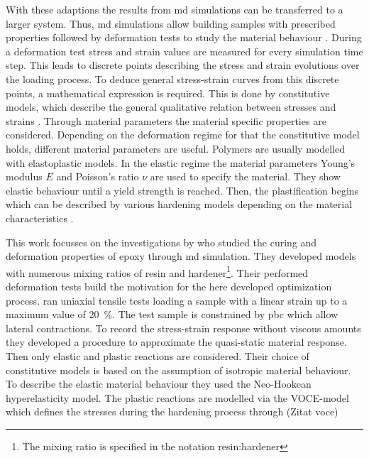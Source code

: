 With these adaptions the results from \acrshort{md} simulations can be transferred to a larger system. 
Thus, \acrshort{md} simulations allow building samples with prescribed properties followed by deformation tests to study the material behaviour \cite{buyukozturk_structural_2011}. During a deformation test stress and strain values are measured for every simulation time step. This leads to discrete points describing the stress and strain evolutions over the loading process. To deduce general stress-strain curves from this discrete points, a mathematical expression is required. This is done by constitutive models, which describe the general qualitative relation between stresses and strains \cite{mergheim_lecture_nodate}. Through material parameters the material specific properties are considered.
Depending on the deformation regime for that the constitutive model holds, different material parameters are useful. Polymers are usually modelled with elastoplastic models. In the elastic regime the material  parameters  Young's modulus $E$ and Poisson's ratio $\nu$ are used to specify the material. They show elastic behaviour until a yield strength is reached. 
Then, the plastification begins which can be described by various hardening models depending on the material characteristics \cite{mergheim_lecture_nodate}. 


This work focusses on the investigations by \citet{ries_deciphering_nodate} who studied the curing and deformation properties of epoxy through \acrshort{md} simulation. They developed models with numerous mixing ratios of resin and hardener\footnote{The mixing ratio is specified in the notation resin:hardener}. Their performed deformation tests build the motivation for the here developed optimization process. \citet{ries_deciphering_nodate} ran uniaxial tensile tests loading a sample with a linear strain up to a maximum value of 20 \%. The test sample is constrained by \acrshort{pbc} which allow lateral contractions. To record the stress-strain response without viscous amounts they developed a procedure to approximate the quasi-static material response. Then only elastic and plastic reactions are considered. Their choice of constitutive models is based on the assumption of isotropic material behaviour. To describe the elastic material behaviour they used the Neo-Hookean hyperelasticity model. The plastic reactions are modelled via the VOCE-model which defines the stresses during the hardening process through (Zitat voce)

